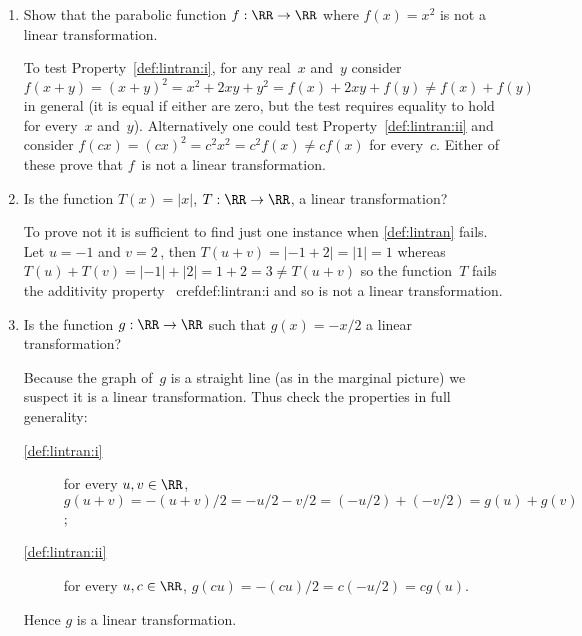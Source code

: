 \begin{example}[1D cases] 
\begin{enumerate}
\item Show that the parabolic function \(f:\RR\to\RR\) where \(f(x)=x^2\) is not a linear transformation.
\begin{solution} 
To test Property~\ref{def:lintran:i},  for any real~\(x\) and~\(y\) consider \(f(x+y)=(x+y)^2=x^2+2xy+y^2=f(x)+2xy+f(y)\neq f(x)+f(y)\) in general (it is equal if either are zero, but the test requires equality to hold for every~\(x\) and~\(y\)).  
Alternatively one could test Property~\ref{def:lintran:ii} and consider \(f(cx)=(cx)^2=c^2x^2=c^2f(x)\neq cf(x)\) for every~\(c\).
Either of these prove that \(f\)~is not a linear transformation.
\end{solution}

\item Is the function \(T(x)=|x|\), \(T:\RR\to\RR\), a linear transformation? 
\begin{solution} 
To prove not it is sufficient to find just one instance when \cref{def:lintran} fails. 
Let \(u=-1\) and \(v=2\)\,, then \(T(u+v)=|-1+2|=|1|=1\) whereas \(T(u)+T(v)=|-1|+|2|=1+2=3\neq T(u+v)\) so the function~\(T\) fails the additivity property~ cref{def:lintran:i} and so is not a linear transformation.
\end{solution}

\item Is the function \(g:\RR\to\RR\) such that \(g(x)=-x/2\) a linear transformation?
\begin{solution} 
Because the graph of~\(g\) is a straight line (as in the marginal picture) we suspect it is a linear transformation.
Thus check the properties in full generality:
\begin{description}
\item[\cref{def:lintran:i}] for every \(u,v\in\RR\), \(g(u+v)=-(u+v)/2=-u/2-v/2=(-u/2)+(-v/2)=g(u)+g(v)\);
\item[\cref{def:lintran:ii}] for every \(u,c\in\RR\), \(g(cu)=-(cu)/2=c(-u/2)=cg(u)\).
\end{description}
Hence \(g\) is a linear transformation.
\end{solution}


\end{enumerate}
\end{example}
